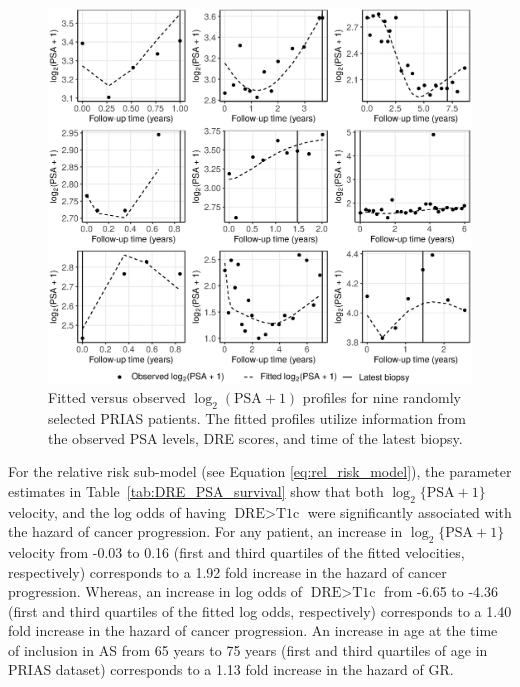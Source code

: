 \begin{figure}[!htb]
\centerline{\includegraphics[width=\columnwidth]{images/fitted_9subject_psa.eps}}
\caption{Fitted versus observed $\log_2 (\mbox{PSA} + 1)$ profiles for nine randomly selected PRIAS patients. The fitted profiles utilize information from the observed PSA levels, DRE scores, and time of the latest biopsy.}
\label{fig:fitted_9subject_psa}
\end{figure}

\clearpage

For the relative risk sub-model (see Equation \ref{eq:rel_risk_model}), the parameter estimates in Table~\ref{tab:DRE_PSA_survival} show that both $\log_2 \{\mbox{PSA} + 1\}$ velocity,  and the log odds of having $\mbox{DRE} > \mbox{T1c}$  were significantly associated with the hazard of cancer progression. For any patient, an increase in $\log_2 \{\mbox{PSA} + 1\}$ velocity from -0.03 to 0.16 (first and third quartiles of the fitted velocities, respectively) corresponds to a 1.92 fold increase in the hazard of cancer progression. Whereas, an increase in log odds of $\mbox{DRE} > \mbox{T1c}$ from -6.65 to -4.36 (first and third quartiles of the fitted log odds, respectively) corresponds to a 1.40 fold increase in the hazard of cancer progression. An increase in age at the time of inclusion in AS from 65 years to 75 years (first and third quartiles of age in PRIAS dataset) corresponds to a 1.13 fold increase in the hazard of GR.

